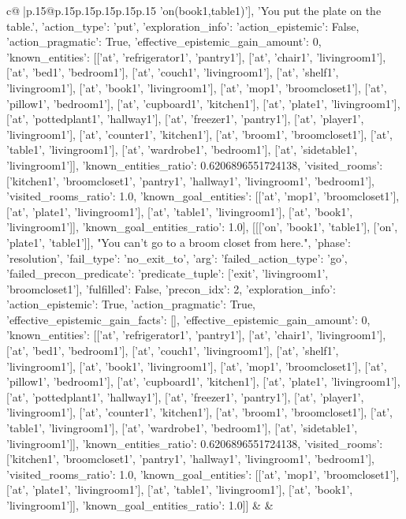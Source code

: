 \documentclass{article}
\begin{document}
{\begin{supertabular}{c@{$\;$}|p{.15\linewidth}@{}p{.15\linewidth}p{.15\linewidth}p{.15\linewidth}p{.15\linewidth}p{.15\linewidth}}
{{{'on(book1,table1)'], 'You put the plate on the table.', {'action_type': 'put', 'exploration_info': {'action_epistemic': False, 'action_pragmatic': True, 'effective_epistemic_gain_amount': 0, 'known_entities': [['at', 'refrigerator1', 'pantry1'], ['at', 'chair1', 'livingroom1'], ['at', 'bed1', 'bedroom1'], ['at', 'couch1', 'livingroom1'], ['at', 'shelf1', 'livingroom1'], ['at', 'book1', 'livingroom1'], ['at', 'mop1', 'broomcloset1'], ['at', 'pillow1', 'bedroom1'], ['at', 'cupboard1', 'kitchen1'], ['at', 'plate1', 'livingroom1'], ['at', 'pottedplant1', 'hallway1'], ['at', 'freezer1', 'pantry1'], ['at', 'player1', 'livingroom1'], ['at', 'counter1', 'kitchen1'], ['at', 'broom1', 'broomcloset1'], ['at', 'table1', 'livingroom1'], ['at', 'wardrobe1', 'bedroom1'], ['at', 'sidetable1', 'livingroom1']], 'known_entities_ratio': 0.6206896551724138, 'visited_rooms': ['kitchen1', 'broomcloset1', 'pantry1', 'hallway1', 'livingroom1', 'bedroom1'], 'visited_rooms_ratio': 1.0, 'known_goal_entities': [['at', 'mop1', 'broomcloset1'], ['at', 'plate1', 'livingroom1'], ['at', 'table1', 'livingroom1'], ['at', 'book1', 'livingroom1']], 'known_goal_entities_ratio': 1.0}}], [[['on', 'book1', 'table1'], ['on', 'plate1', 'table1']], "You can't go to a broom closet from here.", {'phase': 'resolution', 'fail_type': 'no_exit_to', 'arg': {'failed_action_type': 'go', 'failed_precon_predicate': {'predicate_tuple': ['exit', 'livingroom1', 'broomcloset1'], 'fulfilled': False, 'precon_idx': 2}}, 'exploration_info': {'action_epistemic': True, 'action_pragmatic': True, 'effective_epistemic_gain_facts': [], 'effective_epistemic_gain_amount': 0, 'known_entities': [['at', 'refrigerator1', 'pantry1'], ['at', 'chair1', 'livingroom1'], ['at', 'bed1', 'bedroom1'], ['at', 'couch1', 'livingroom1'], ['at', 'shelf1', 'livingroom1'], ['at', 'book1', 'livingroom1'], ['at', 'mop1', 'broomcloset1'], ['at', 'pillow1', 'bedroom1'], ['at', 'cupboard1', 'kitchen1'], ['at', 'plate1', 'livingroom1'], ['at', 'pottedplant1', 'hallway1'], ['at', 'freezer1', 'pantry1'], ['at', 'player1', 'livingroom1'], ['at', 'counter1', 'kitchen1'], ['at', 'broom1', 'broomcloset1'], ['at', 'table1', 'livingroom1'], ['at', 'wardrobe1', 'bedroom1'], ['at', 'sidetable1', 'livingroom1']], 'known_entities_ratio': 0.6206896551724138, 'visited_rooms': ['kitchen1', 'broomcloset1', 'pantry1', 'hallway1', 'livingroom1', 'bedroom1'], 'visited_rooms_ratio': 1.0, 'known_goal_entities': [['at', 'mop1', 'broomcloset1'], ['at', 'plate1', 'livingroom1'], ['at', 'table1', 'livingroom1'], ['at', 'book1', 'livingroom1']], 'known_goal_entities_ratio': 1.0}}]] 
	  } 
	   } 
	   } 
	 & & \\ 
 


\end{supertabular}}
\end{document}
